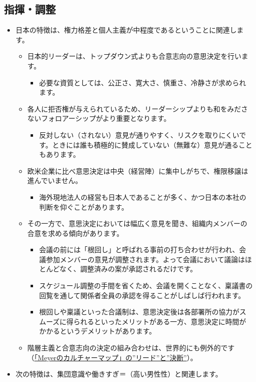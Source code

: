 \documentclass[
]{book}
\providecommand{\tightlist}{%
  \setlength{\itemsep}{0pt}\setlength{\parskip}{0pt}}
\begin{document}
\hypertarget{japan-command}{%
\subsection{指揮・調整}\label{japan-command}}

\begin{itemize}
\item
  日本の特徴は、権力格差と個人主義が中程度であるということに関連します。

  \begin{itemize}
  \item
    日本的リーダーは、トップダウン式よりも合意志向の意思決定を行います。

    \begin{itemize}
    \tightlist
    \item
      必要な資質としては、公正さ、寛大さ、慎重さ、冷静さが求められます。
    \end{itemize}
  \item
    各人に拒否権が与えられているため、リーダーシップよりも和をみださないフォロアーシップがより重要となります。

    \begin{itemize}
    \tightlist
    \item
      反対しない（されない）意見が通りやすく、リスクを取りにくいです。ときには誰も積極的に賛成していない（無難な）意見が通ることもあります。
    \end{itemize}
  \item
    欧米企業に比べ意思決定は中央（経営陣）に集中しがちで、権限移譲は進んでいません。

    \begin{itemize}
    \tightlist
    \item
      海外現地法人の経営も日本人であることが多く、かつ日本の本社の判断を仰ぐことがあります。
    \end{itemize}
  \item
    その一方で、意思決定においては幅広く意見を聞き、組織内メンバーの合意を求める傾向があります。

    \begin{itemize}
    \item
      会議の前には「根回し」と呼ばれる事前の打ち合わせが行われ、会議参加メンバーの意見が調整されます。よって会議において議論はほとんどなく、調整済みの案が承認されるだけです。
    \item
      スケジュール調整の手間を省くため、会議を開くことなく、稟議書の回覧を通して関係者全員の承認を得ることがしばしば行われます。
    \item
      根回しや稟議といった合議制は、意思決定後は各部署所の協力がスムーズに得られるといったメリットがある一方、意思決定に時間がかかるというデメリットがあります。
    \end{itemize}
  \item
    階層主義と合意志向の決定の組み合わせは、世界的にも例外的です（\protect\hyperlink{meyer}{「Meyerのカルチャーマップ」の''リード''と''決断''}）。
  \end{itemize}
\item
  次の特徴は、集団意識や働きすぎ＝（高い男性性）と関連します。


\end{itemize}
\end{document}
